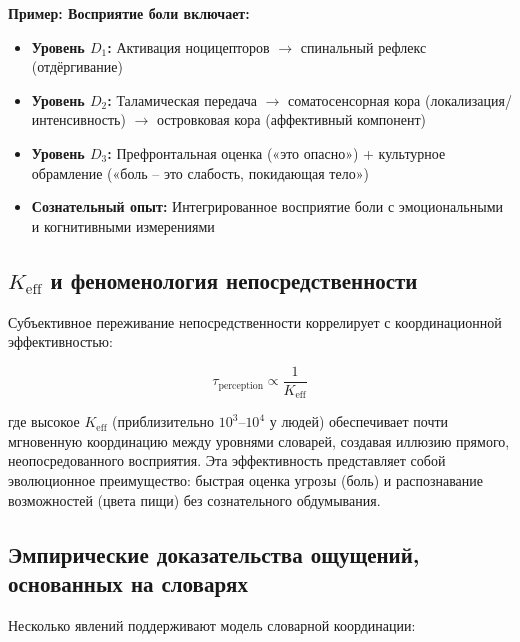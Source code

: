 \documentclass[12pt,a4paper]{article}
\newcommand{\eff}{\mathrm{eff}}
\newcommand{\Ke}{K_{\eff}}
\begin{document}
	\textbf{Пример: Восприятие боли включает:}
	\begin{itemize}
		\item \textbf{Уровень $D_1$:} Активация ноцицепторов $\rightarrow$ спинальный рефлекс (отдёргивание)
		\item \textbf{Уровень $D_2$:} Таламическая передача $\rightarrow$ соматосенсорная кора (локализация/интенсивность) $\rightarrow$ островковая кора (аффективный компонент)
		\item \textbf{Уровень $D_3$:} Префронтальная оценка («это опасно») + культурное обрамление («боль – это слабость, покидающая тело»)
		\item \textbf{Сознательный опыт:} Интегрированное восприятие боли с эмоциональными и когнитивными измерениями
	\end{itemize}
	
	\subsection{$\Ke$ и феноменология непосредственности}
	
	Субъективное переживание непосредственности коррелирует с координационной эффективностью:
	
	\[
	\tau_{\text{perception}} \propto \frac{1}{\Ke}
	\]
	
	где высокое $\Ke$ (приблизительно $10^3$–$10^4$ у людей) обеспечивает почти мгновенную координацию между уровнями словарей, создавая иллюзию прямого, неопосредованного восприятия. Эта эффективность представляет собой эволюционное преимущество: быстрая оценка угрозы (боль) и распознавание возможностей (цвета пищи) без сознательного обдумывания.
	
	\subsection{Эмпирические доказательства ощущений, основанных на словарях}
	
	Несколько явлений поддерживают модель словарной координации:
	
\end{document}
